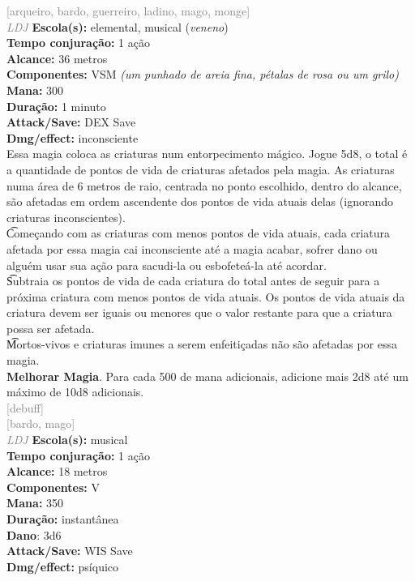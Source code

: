 \documentclass{RPG_Adventure}[2021/10/20]
\begin{document}
{\scriptsize \textcolor{gray}{[arqueiro, bardo, guerreiro, ladino, mago, monge]\\}}
{\tiny \textcolor{gray}{\textit{LDJ}}}
{\small \t \textbf{Escola(s):} elemental, musical (\textit{veneno})\\\t \textbf{Tempo conjuração:} 1 ação\\\t \textbf{Alcance:} 36 metros\\\t \textbf{Componentes:} VSM \textit{(um punhado de areia fina, pétalas de rosa ou um grilo)}\\\t \textbf{Mana:} 300\\\t \textbf{Duração:} 1 minuto\\\t \textbf{Attack/Save:} DEX Save\\\t \textbf{Dmg/effect:} inconsciente\\}
{\normalsize Essa magia coloca as criaturas num entorpecimento mágico. Jogue 5d8, o total é a quantidade de pontos de vida de criaturas afetados pela magia. As criaturas numa área de 6 metros de raio, centrada no ponto escolhido, dentro do alcance, são afetadas em ordem ascendente dos pontos de vida atuais delas (ignorando criaturas inconscientes).\\\t Começando com as criaturas com menos pontos de vida atuais, cada criatura afetada por essa magia cai inconsciente até a magia acabar, sofrer dano ou alguém usar sua ação para sacudi-la ou esbofeteá-la até acordar.\\\t Subtraia os pontos de vida de cada criatura do total antes de seguir para a próxima criatura com menos pontos de vida atuais. Os pontos de vida atuais da criatura devem ser iguais ou menores que o valor restante para que a criatura possa ser afetada.\\\t Mortos-vivos e criaturas imunes a serem enfeitiçadas não são afetadas por essa magia.\\\t \textbf{Melhorar Magia}. Para cada 500 de mana adicionais, adicione mais 2d8 até um máximo de 10d8 adicionais.\\}
{\scriptsize \textcolor{gray}{[debuff]\\}}
{\scriptsize \textcolor{gray}{[bardo, mago]\\}}
{\tiny \textcolor{gray}{\textit{LDJ}}}
{\small \t \textbf{Escola(s):} musical\\\t \textbf{Tempo conjuração:} 1 ação\\\t \textbf{Alcance:} 18 metros\\\t \textbf{Componentes:} V\\\t \textbf{Mana:} 350\\\t \textbf{Duração:} instantânea\\\t \textbf{Dano}: 3d6\\\t \textbf{Attack/Save:} WIS Save\\\t \textbf{Dmg/effect:} psíquico\\}
\end{document}

